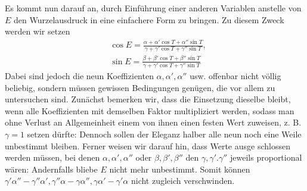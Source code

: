 \begingroup
\renewcommand{\arraystretch}{1.45}
Es kommt nun darauf an, durch Einführung einer anderen Variablen anstelle von $E$ den Wurzelausdruck in eine einfachere Form zu bringen. Zu diesem Zweck werden wir setzen
\[
\begin{aligned}
&\cos E=\frac{\alpha+\alpha'\cos T+\alpha''\sin T}{\gamma+\gamma'\cos T+\gamma''\sin T},\\[6pt]
&
\sin E=\frac{\beta+\beta'\cos T+\beta''\sin T}{\gamma+\gamma'\cos T+\gamma''\sin T}
\end{aligned}
\]
Dabei sind jedoch die neun Koeffizienten $\alpha,\alpha',\alpha''$ usw. offenbar nicht völlig beliebig, sondern müssen gewissen Bedingungen genügen, die vor allem zu untersuchen sind. Zunächst bemerken wir, dass die Einsetzung dieselbe bleibt, wenn alle Koeffizienten mit demselben Faktor multipliziert werden, sodass man ohne Verlust an Allgemeinheit einem von ihnen einen festen Wert zuweisen, z. B. $\gamma=1$ setzen dürfte: Dennoch sollen der Eleganz halber alle neun noch eine Weile unbestimmt bleiben. Ferner weisen wir darauf hin, dass Werte ausge%
schlossen werden müssen, bei denen $\alpha,\alpha',\alpha''$ oder $\beta,\beta',\beta''$ den $\gamma,\gamma'.\gamma''$ jeweils proportional wären: Andernfalls bliebe $E$ nicht mehr unbestimmt. Somit können $\gamma'\alpha''-\gamma''\alpha',\gamma''\alpha-\gamma\alpha'',\gamma\alpha'-\gamma'\alpha$ nicht zugleich verschwinden.

